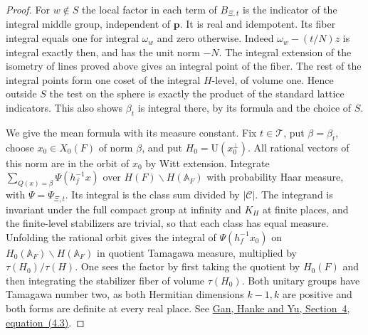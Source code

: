 \documentclass[a4paper,11pt]{article}
\theoremstyle{definition}
\theoremstyle{remark}
\numberwithin{equation}{section}
\begin{document}
\begin{proof}
For \(w\notin S\) the local factor in each term of \(B_{\Xi,t}\)
is the indicator of the integral middle group, independent of
\(\mathbf p\). It is real and idempotent. Its fiber integral
equals one for integral \(\omega_w\) and zero otherwise.
Indeed \(\omega_w-(t/N)z\) is integral exactly then, and has
the unit norm \(-N\). The integral extension of the isometry
of lines proved above gives an integral point of the fiber.
The rest of the integral points form one coset of the integral
\(H\)-level, of volume one. Hence outside \(S\) the test on
the sphere is exactly the product of the standard lattice
indicators. This also shows \(\beta_t\) is integral there,
by its formula and the choice of \(S\).

We give the mean formula with its measure constant. Fix
\(t\in\mathcal T\), put \(\beta=\beta_t\), choose
\(x_0\in X_0(F)\) of norm \(\beta\), and put
\(H_0=\mathrm U(x_0^\perp)\). All rational vectors of this
norm are in the orbit of \(x_0\) by Witt extension. Integrate
\(\sum_{Q(x)=\beta}\Psi(h_f^{-1}x)\) over
\(H(F)\backslash H(\mathbb A_F)\) with probability Haar
measure, with \(\Psi=\Psi_{\Xi,t}\).
Its integral is the class sum divided by \(|\mathcal C|\).
The integrand is invariant under the full compact group at
infinity and \(K_H\) at finite places, and the finite-level
stabilizers are trivial, so that each class has equal measure.
Unfolding the rational orbit gives the integral of
\(\Psi(h_f^{-1}x_0)\) on \(H_0(\mathbb A_F)\backslash
H(\mathbb A_F)\) in quotient Tamagawa measure, multiplied by
\(\tau(H_0)/\tau(H)\). One sees the factor by first taking the
quotient by \(H_0(F)\) and then integrating the stabilizer
fiber of volume \(\tau(H_0)\). Both unitary groups have Tamagawa
number two, as both Hermitian dimensions \(k-1,k\) are positive
and both forms are definite at every real place.
See \href{https://web.math.princeton.edu/~jonhanke/Web-02/Mass-Formula-of-Shimura/shimura-mass.pdf}{Gan, Hanke and Yu, Section~4, equation~(4.3)}.


\end{proof}
\end{document}
